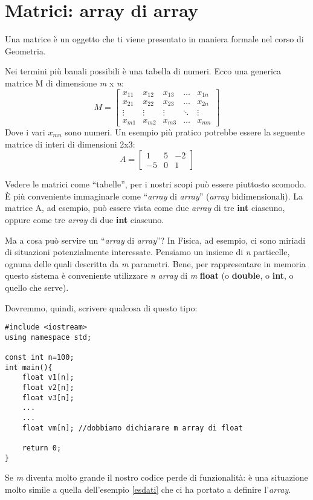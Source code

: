 \section{Matrici: array di array}
Una matrice è un oggetto che ti viene presentato in maniera formale nel corso di Geometria. 

Nei termini più banali possibili è una tabella di numeri. Ecco una generica matrice M di dimensione \emph{m} x \emph{n}:
\[
M = 
\begin{bmatrix}
	x_{11} & x_{12} & x_{13} & \dots  & x_{1n} \\
	x_{21} & x_{22} & x_{23} & \dots  & x_{2n} \\
	\vdots & \vdots & \vdots & \ddots & \vdots \\
	x_{m1} & x_{m2} & x_{m3} & \dots  & x_{mn}
	\end{bmatrix}
\]
Dove i vari $x_{mn}$ sono numeri. Un esempio più pratico potrebbe essere la seguente matrice di interi di dimensioni 2x3:
\[
A = 
\begin{bmatrix}
	1 & 5 & -2 \\
	-5& 0&1 
\end{bmatrix}
\]

Vedere le matrici come ``tabelle'', per i nostri scopi può essere piuttosto scomodo. È più conveniente immaginarle come ``\emph{array} di \emph{array}'' (\emph{array} bidimensionali). La matrice A, ad esempio, può essere vista come due \emph{array} di tre \textbf{int} ciascuno, oppure come tre \emph{array} di due \textbf{int} ciascuno.

Ma a cosa può servire un ``\emph{array} di \emph{array}''? In Fisica, ad esempio, ci sono miriadi di situazioni potenzialmente interessate. Pensiamo un insieme di \emph{n} particelle, ognuna delle quali descritta da \emph{m} parametri. Bene, per rappresentare in memoria questo sistema è conveniente utilizzare \emph{n} \emph{array} di \emph{m} \textbf{float} (o \textbf{double}, o \textbf{int}, o quello che serve). 

Dovremmo, quindi, scrivere qualcosa di questo tipo:

\begin{lstlisting}[label=mat1]
#include <iostream>
using namespace std;

const int n=100;
int main(){
	float v1[n];
	float v2[n];
	float v3[n];
	...
	...
	float vm[n]; //dobbiamo dichiarare m array di float
	
	return 0;
}
\end{lstlisting}
Se \emph{m} diventa molto grande il nostro codice perde di funzionalità: è una situazione molto simile a quella dell'esempio \ref{esdati} che ci ha portato a definire l'\emph{array}.

